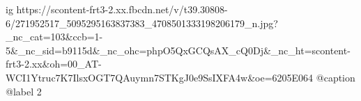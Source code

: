  
 
 
 
 

\ifcmt
  ig https://scontent-frt3-2.xx.fbcdn.net/v/t39.30808-6/271952517_5095295163837383_4708501333198206179_n.jpg?_nc_cat=103&ccb=1-5&_nc_sid=b9115d&_nc_ohc=phpO5QxGCQsAX_cQ0Dj&_nc_ht=scontent-frt3-2.xx&oh=00_AT-WCI1Ytruc7K7IlsxOGT7QAuymn7STKgJ0e9SsIXFA4w&oe=6205E064
  @caption @label 2
\fi
